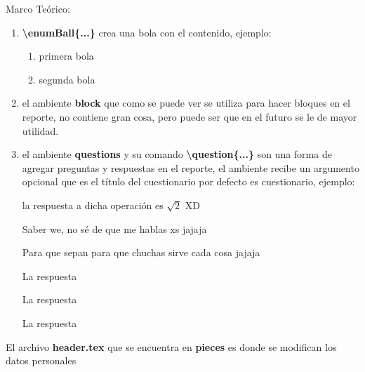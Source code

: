 \documentclass[11pt, letterpaper]{article}
\begin{document}
\begin{block}{Marco Teórico:\\}
\begin{enumerate}
			\item \textbf{\textbackslash enumBall\{...\}} crea una bola con el contenido, ejemplo:
			
			\renewcommand{\textballcolor}{white}
			
			
			\renewcommand{\ballcolor}{green}
			
			\begin{enumerate}[label=\enumBall{\arabic*}]
				\item primera bola
				\item segunda bola
			\end{enumerate}
		
			
			\item el ambiente \textbf{block} que como se puede ver se utiliza para hacer bloques en el reporte, no contiene gran cosa, pero puede ser que en el futuro se le de mayor utilidad.
			
			\item el ambiente \textbf{questions} y su comando \textbf{\textbackslash question\{...\}} son una forma de agregar preguntas y respuestas en el reporte, el ambiente recibe un argumento opcional que es el título del cuestionario por defecto es cuestionario, ejemplo:
			
			\begin{questions}[Preguntas Tontas]
				
				 la respuesta a dicha operación es $\sqrt{2}$ XD
				
				 Saber we, no sé de que me hablas xs jajaja

				 Para que sepan para que chuchas sirve cada cosa jajaja
			\end{questions}	
			 \newpage %
			\begin{questions}
				
				 La respuesta
				
				 La respuesta
				
				 La respuesta
				
			\end{questions}
		\end{enumerate}
	
		El archivo \textbf{header.tex} que se encuentra en \textbf{pieces} es donde se modifican los datos personales
		
	\end{block}
\end{document}
